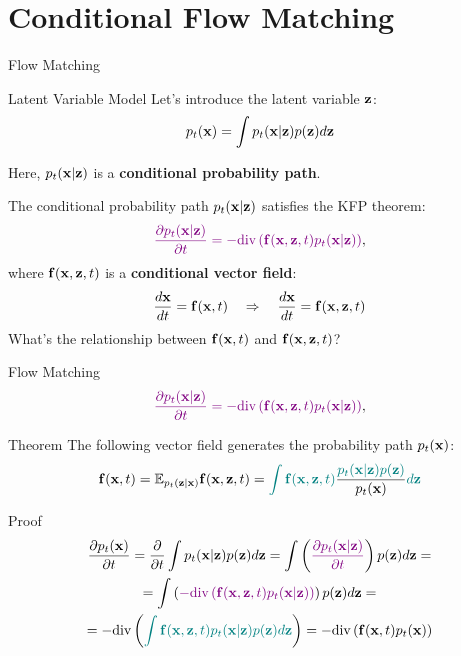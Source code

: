 \documentclass{beamer}
\begin{document}
\section{Conditional Flow Matching}
\begin{frame}{Flow Matching}
	\vspace{-0.5cm}
	\begin{block}{Latent Variable Model}
		Let's introduce the latent variable $\mathbf{z}$:
		\[
			p_t(\mathbf{x}) = \int p_t(\mathbf{x} | \mathbf{z}) p(\mathbf{z}) d \mathbf{z} 
		\]
		\vspace{-0.5cm}
	\end{block}
	Here, $p_t(\mathbf{x} | \mathbf{z})$ is a \textbf{conditional probability path}.
	
	The conditional probability path $p_t(\mathbf{x} | \mathbf{z})$ satisfies the KFP theorem:
	\[
		{\color{violet}\frac{\partial p_t(\mathbf{x} | \mathbf{z})}{\partial t} = - \text{div}\left(\mathbf{f}(\mathbf{x}, \mathbf{z}, t) p_t(\mathbf{x} | \mathbf{z})\right)},
	\]
	where $\mathbf{f}(\mathbf{x}, \mathbf{z}, t)$ is a \textbf{conditional vector field}:
	\[
		\frac{d\mathbf{x}}{dt} = \mathbf{f}(\mathbf{x}, t) \quad \Rightarrow \quad \frac{d\mathbf{x}}{dt} = \mathbf{f}(\mathbf{x}, \mathbf{z}, t)
	\]
	\vspace{-0.3cm}
	What's the relationship between $\mathbf{f}(\mathbf{x}, t)$ and $\mathbf{f}(\mathbf{x}, \mathbf{z}, t)$?
\end{frame}
\begin{frame}{Flow Matching}
	\[
		{\color{violet}\frac{\partial p_t(\mathbf{x} | \mathbf{z})}{\partial t} = - \text{div}\left(\mathbf{f}(\mathbf{x}, \mathbf{z}, t) p_t(\mathbf{x} | \mathbf{z})\right)},
	\]
	\vspace{-0.3cm}
	\begin{block}{Theorem}
		The following vector field generates the probability path $p_t(\mathbf{x})$:
		\vspace{-0.2cm}
		\[
			\mathbf{f}(\mathbf{x}, t) = \mathbb{E}_{p_t(\mathbf{z} | \mathbf{x})} \mathbf{f}(\mathbf{x}, \mathbf{z}, t)  = {\color{teal}\int \mathbf{f}(\mathbf{x}, \mathbf{z}, t)} \frac{\color{teal}p_t(\mathbf{x} | \mathbf{z}) p(\mathbf{z})}{p_t(\mathbf{x})} {\color{teal}d \mathbf{z}}
		\]
		\vspace{-0.5cm}
	\end{block}
	\begin{block}{Proof}
		\vspace{-0.7cm}
		\begin{multline*}
			\frac{\partial p_t(\mathbf{x})}{\partial t} = \frac{\partial}{\partial t} \int p_t(\mathbf{x} | \mathbf{z}) p(\mathbf{z}) d \mathbf{z} =  \int \left( {\color{violet} \frac{\partial p_t(\mathbf{x} | \mathbf{z})}{\partial t} } \right) p(\mathbf{z}) d \mathbf{z} = \\
			= \int \left( {\color{violet} - \text{div}\left(\mathbf{f}(\mathbf{x}, \mathbf{z}, t) p_t(\mathbf{x} | \mathbf{z})\right) } \right) p(\mathbf{z}) d \mathbf{z} = \\
			= - \text{div} \left({\color{teal}\int \mathbf{f}(\mathbf{x}, \mathbf{z}, t) p_t(\mathbf{x} | \mathbf{z}) p(\mathbf{z}) d \mathbf{z} }\right) = - \text{div}  \left(\mathbf{f}(\mathbf{x}, t) p_t(\mathbf{x})\right)
		\end{multline*}
	\end{block}
\end{frame}
\end{document}
